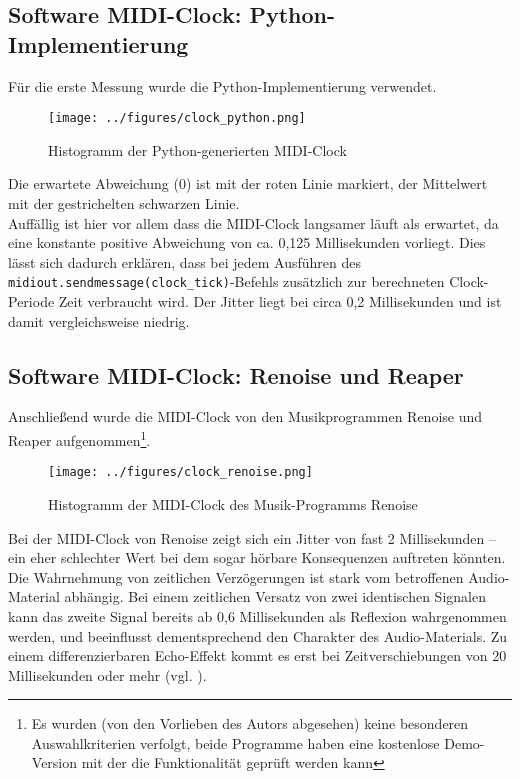 \clearpage

\subsection{Software MIDI-Clock: Python-Implementierung}
Für die erste Messung wurde die Python-Implementierung verwendet.\
\begin{figure}[H]
	\centering
	\captionsetup{justification=centering,margin=2cm}
		\texttt{[image: ../figures/clock\_python.png]}
		\caption[Histogramm der Python-generierten MIDI-Clock]{Histogramm der Python-generierten MIDI-Clock}
	\label{fig:ice40_pmod_pins}
\end{figure}
Die erwartete Abweichung (0) ist mit der roten Linie markiert, der Mittelwert mit der gestrichelten schwarzen Linie.\\
Auffällig ist hier vor allem dass die MIDI-Clock langsamer läuft als erwartet, da eine konstante positive Abweichung von ca. 0,125 Millisekunden vorliegt. Dies lässt sich dadurch erklären, dass bei jedem Ausführen des {\tt midiout.sendmessage(clock\_tick)}-Befehls zusätzlich zur berechneten Clock-Periode Zeit verbraucht wird. Der Jitter liegt bei circa 0,2 Millisekunden und ist damit vergleichsweise niedrig.


\subsection{Software MIDI-Clock: Renoise und Reaper}

Anschließend wurde die MIDI-Clock von den Musikprogrammen Renoise und Reaper aufgenommen\footnote{Es wurden (von den Vorlieben des Autors abgesehen) keine besonderen Auswahlkriterien verfolgt, beide Programme haben eine kostenlose Demo-Version mit der die Funktionalität geprüft werden kann}.

\begin{figure}[H]
	\centering
	\captionsetup{justification=centering,margin=2cm}
		\texttt{[image: ../figures/clock\_renoise.png]}
		\caption[Histogramm der MIDI-Clock des Musik-Programms Renoise]{Histogramm der MIDI-Clock des Musik-Programms Renoise}
	\label{fig:ice40_pmod_pins}
\end{figure}

Bei der MIDI-Clock von Renoise zeigt sich ein Jitter von fast 2 Millisekunden -- ein eher schlechter Wert bei dem sogar hörbare Konsequenzen auftreten könnten.
Die Wahrnehmung von zeitlichen Verzögerungen ist stark vom betroffenen Audio-Material abhängig. Bei einem zeitlichen Versatz von zwei identischen Signalen kann das zweite Signal bereits ab 0,6 Millisekunden als Reflexion wahrgenommen werden, und beeinflusst dementsprechend den Charakter des Audio-Materials. Zu einem differenzierbaren Echo-Effekt kommt es erst bei Zeitverschiebungen von 20 Millisekunden oder mehr (vgl. \cite[S.~29]{ma:falke}).   



